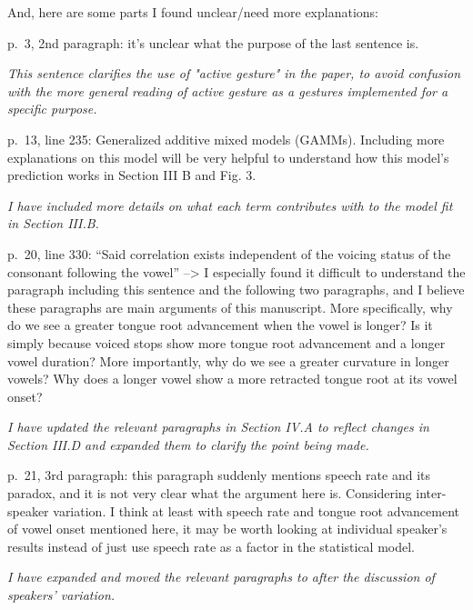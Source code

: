\documentclass[]{article}
\begin{document}
And, here are some parts I found unclear/need more explanations:

p.~3, 2nd paragraph: it's unclear what the purpose of the last sentence
is.

\begin{adjustwidth}{1cm}{} \textit{
This sentence clarifies the use of "active gesture" in the paper, to avoid confusion with the more general reading of active gesture as a gestures implemented for a specific purpose.
} \end{adjustwidth}

p.~13, line 235: Generalized additive mixed models (GAMMs). Including
more explanations on this model will be very helpful to understand how
this model's prediction works in Section III B and Fig. 3.

\begin{adjustwidth}{1cm}{} \textit{
I have included more details on what each term contributes with to the model fit in Section III.B.
} \end{adjustwidth}

p.~20, line 330: ``Said correlation exists independent of the voicing
status of the consonant following the vowel'' --\textgreater{} I
especially found it difficult to understand the paragraph including this
sentence and the following two paragraphs, and I believe these
paragraphs are main arguments of this manuscript. More specifically, why
do we see a greater tongue root advancement when the vowel is longer? Is
it simply because voiced stops show more tongue root advancement and a
longer vowel duration? More importantly, why do we see a greater
curvature in longer vowels? Why does a longer vowel show a more
retracted tongue root at its vowel onset?

\begin{adjustwidth}{1cm}{} \textit{
I have updated the relevant paragraphs in Section IV.A to reflect changes in Section III.D and expanded them to clarify the point being made.
} \end{adjustwidth}

p.~21, 3rd paragraph: this paragraph suddenly mentions speech rate and
its paradox, and it is not very clear what the argument here is.
Considering inter-speaker variation. I think at least with speech rate
and tongue root advancement of vowel onset mentioned here, it may be
worth looking at individual speaker's results instead of just use speech
rate as a factor in the statistical model.

\begin{adjustwidth}{1cm}{} \textit{
I have expanded and moved the relevant paragraphs to after the discussion of speakers' variation.
} \end{adjustwidth}
\end{document}
